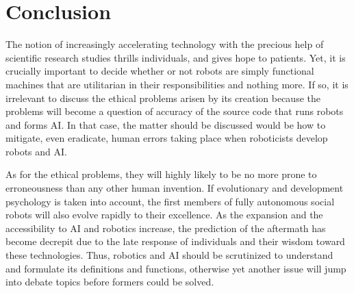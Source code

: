 \documentclass[man]{apa6}
\begin{document}
\section{Conclusion}
The notion of increasingly accelerating technology with the precious help of scientific research studies thrills individuals, and gives hope to patients.
Yet, it is crucially important to decide whether or not robots are simply functional machines that are utilitarian in their responsibilities and nothing more.
If so, it is irrelevant to discuss the ethical problems arisen by its creation because the problems will become a question of accuracy of the source code that runs robots and forms AI.
In that case, the matter should be discussed would be how to mitigate, even eradicate, human errors taking place when roboticists develop robots and AI. \par
As for the ethical problems, they will highly likely to be no more prone to erroneousness than any other human invention.
If evolutionary and development psychology is taken into account, the first members of fully autonomous social robots will also evolve rapidly to their excellence.
As the expansion and the accessibility to AI and robotics increase, the prediction of the aftermath has become decrepit due to the late response of individuals and their wisdom toward these technologies.
Thus, robotics and AI should be scrutinized to understand and formulate its definitions and functions, otherwise yet another issue will jump into debate topics before formers could be solved.


\end{document}
